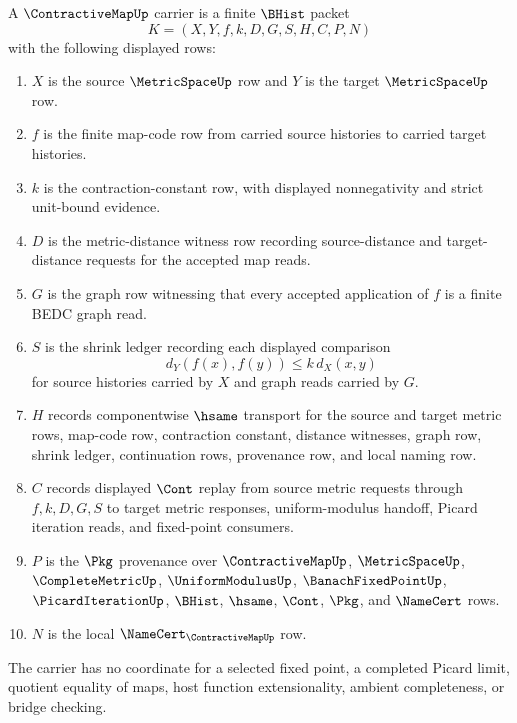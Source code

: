 \begin{definition}
\label{def:contractive-map-carrier}
A $\ContractiveMapUp$ carrier is a finite $\BHist$ packet
$$
K=(X,Y,f,k,D,G,S,H,C,P,N)
$$
with the following displayed rows:
\begin{enumerate}
\item $X$ is the source $\MetricSpaceUp$ row and $Y$ is the target $\MetricSpaceUp$ row.
\item $f$ is the finite map-code row from carried source histories to carried target histories.
\item $k$ is the contraction-constant row, with displayed nonnegativity and strict unit-bound evidence.
\item $D$ is the metric-distance witness row recording source-distance and target-distance requests for the accepted map reads.
\item $G$ is the graph row witnessing that every accepted application of $f$ is a finite BEDC graph read.
\item $S$ is the shrink ledger recording each displayed comparison
$$
d_Y(f(x),f(y))\leq k\,d_X(x,y)
$$
for source histories carried by $X$ and graph reads carried by $G$.
\item $H$ records componentwise $\hsame$ transport for the source and target metric rows, map-code row, contraction constant, distance witnesses, graph row, shrink ledger, continuation rows, provenance row, and local naming row.
\item $C$ records displayed $\Cont$ replay from source metric requests through $f,k,D,G,S$ to target metric responses, uniform-modulus handoff, Picard iteration reads, and fixed-point consumers.
\item $P$ is the $\Pkg$ provenance over $\ContractiveMapUp$, $\MetricSpaceUp$, $\CompleteMetricUp$, $\UniformModulusUp$, $\BanachFixedPointUp$, $\PicardIterationUp$, $\BHist$, $\hsame$, $\Cont$, $\Pkg$, and $\NameCert$ rows.
\item $N$ is the local $\NameCert_{\ContractiveMapUp}$ row.
\end{enumerate}
The carrier has no coordinate for a selected fixed point, a completed Picard limit, quotient equality of maps, host function extensionality, ambient completeness, or bridge checking.
\end{definition}

